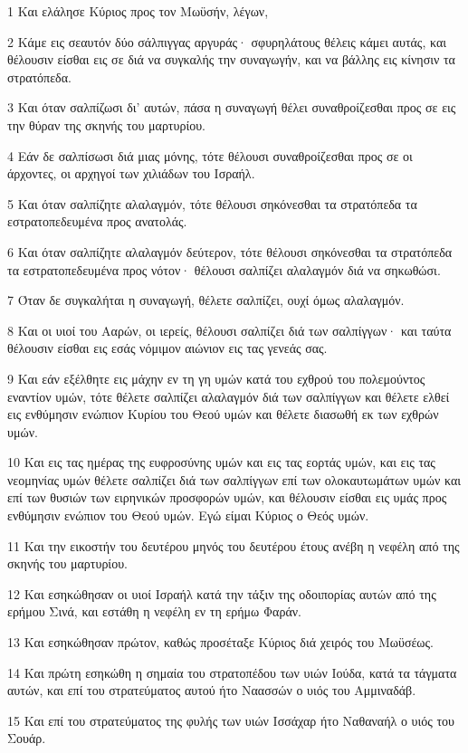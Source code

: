 \par 1 Και ελάλησε Κύριος προς τον Μωϋσήν, λέγων,
\par 2 Κάμε εις σεαυτόν δύο σάλπιγγας αργυράς· σφυρηλάτους θέλεις κάμει αυτάς, και θέλουσιν είσθαι εις σε διά να συγκαλής την συναγωγήν, και να βάλλης εις κίνησιν τα στρατόπεδα.
\par 3 Και όταν σαλπίζωσι δι' αυτών, πάσα η συναγωγή θέλει συναθροίζεσθαι προς σε εις την θύραν της σκηνής του μαρτυρίου.
\par 4 Εάν δε σαλπίσωσι διά μιας μόνης, τότε θέλουσι συναθροίζεσθαι προς σε οι άρχοντες, οι αρχηγοί των χιλιάδων του Ισραήλ.
\par 5 Και όταν σαλπίζητε αλαλαγμόν, τότε θέλουσι σηκόνεσθαι τα στρατόπεδα τα εστρατοπεδευμένα προς ανατολάς.
\par 6 Και όταν σαλπίζητε αλαλαγμόν δεύτερον, τότε θέλουσι σηκόνεσθαι τα στρατόπεδα τα εστρατοπεδευμένα προς νότον· θέλουσι σαλπίζει αλαλαγμόν διά να σηκωθώσι.
\par 7 Όταν δε συγκαλήται η συναγωγή, θέλετε σαλπίζει, ουχί όμως αλαλαγμόν.
\par 8 Και οι υιοί του Ααρών, οι ιερείς, θέλουσι σαλπίζει διά των σαλπίγγων· και ταύτα θέλουσιν είσθαι εις εσάς νόμιμον αιώνιον εις τας γενεάς σας.
\par 9 Και εάν εξέλθητε εις μάχην εν τη γη υμών κατά του εχθρού του πολεμούντος εναντίον υμών, τότε θέλετε σαλπίζει αλαλαγμόν διά των σαλπίγγων και θέλετε ελθεί εις ενθύμησιν ενώπιον Κυρίου του Θεού υμών και θέλετε διασωθή εκ των εχθρών υμών.
\par 10 Και εις τας ημέρας της ευφροσύνης υμών και εις τας εορτάς υμών, και εις τας νεομηνίας υμών θέλετε σαλπίζει διά των σαλπίγγων επί των ολοκαυτωμάτων υμών και επί των θυσιών των ειρηνικών προσφορών υμών, και θέλουσιν είσθαι εις υμάς προς ενθύμησιν ενώπιον του Θεού υμών. Εγώ είμαι Κύριος ο Θεός υμών.
\par 11 Και την εικοστήν του δευτέρου μηνός του δευτέρου έτους ανέβη η νεφέλη από της σκηνής του μαρτυρίου.
\par 12 Και εσηκώθησαν οι υιοί Ισραήλ κατά την τάξιν της οδοιπορίας αυτών από της ερήμου Σινά, και εστάθη η νεφέλη εν τη ερήμω Φαράν.
\par 13 Και εσηκώθησαν πρώτον, καθώς προσέταξε Κύριος διά χειρός του Μωϋσέως.
\par 14 Και πρώτη εσηκώθη η σημαία του στρατοπέδου των υιών Ιούδα, κατά τα τάγματα αυτών, και επί του στρατεύματος αυτού ήτο Ναασσών ο υιός του Αμμιναδάβ.
\par 15 Και επί του στρατεύματος της φυλής των υιών Ισσάχαρ ήτο Ναθαναήλ ο υιός του Σουάρ.
